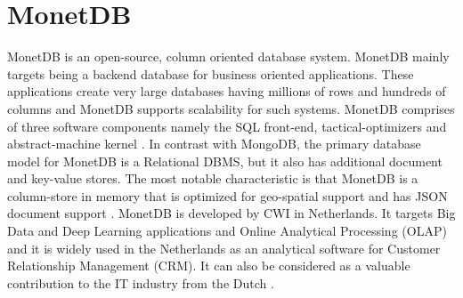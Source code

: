 \section{MonetDB}

MonetDB is an open-source, column oriented database system. MonetDB mainly targets being a backend database for business oriented applications. These applications create very large databases having millions of rows and hundreds of columns and MonetDB supports scalability for such systems. MonetDB comprises of three software components namely the SQL front-end, tactical-optimizers and abstract-machine kernel \cite{hid-sp18-416-www-monetdb-features}. In contrast with MongoDB, the primary database model for MonetDB is a Relational DBMS, but it also has additional document and key-value stores. The most notable characteristic is that MonetDB is a column-store in memory that is optimized for geo-spatial support and has JSON document support \cite{hid-sp18-416-www-monetdb-mongodb-comparison}. MonetDB is developed by CWI in Netherlands. It targets Big Data and Deep Learning applications and Online Analytical Processing (OLAP) and it is widely used in the Netherlands as an analytical software for Customer Relationship Management (CRM). It can also be considered as a valuable contribution to the IT industry from the Dutch \cite{hid-sp18-416-www-monetdb-dutch}.
